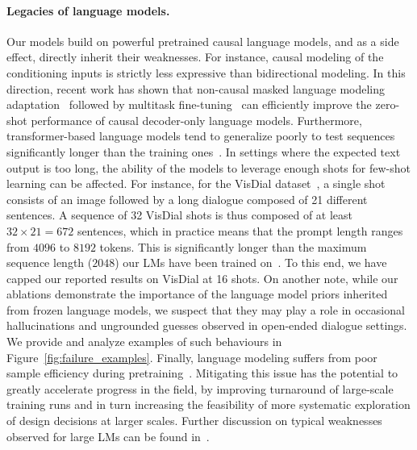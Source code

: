 \paragraph{Legacies of language models.} Our models build on powerful pretrained causal language models, and as a side effect, directly inherit their weaknesses.
For instance, causal modeling of the conditioning inputs is strictly less expressive than bidirectional modeling.
In this direction, recent work has shown that non-causal masked language modeling adaptation~\citep{wang2022noncausaladaptation} followed by multitask fine-tuning~\citep{t0,wei2021finetuned,xu2022zeroprompt} can efficiently improve the zero-shot performance of causal decoder-only language models.
Furthermore, transformer-based language models tend to generalize poorly to test sequences significantly longer than the training ones~\citep{press2021train}.
In settings where the expected text output is too long, the ability of the models to leverage enough shots for few-shot learning can be affected.
For instance, for the VisDial dataset~\citep{das2017visual}, a single shot consists of an image followed by a long dialogue composed of 21 different sentences.
A sequence of 32 VisDial shots is thus composed of at least $32 \times 21 = 672$ sentences, which in practice means that the prompt length ranges from $4096$ to $8192$ tokens.
This is significantly longer than the maximum sequence length ($2048$) our LMs have been trained on~\citep{chinchilla}.
To this end, we have capped our reported results on VisDial at 16 shots.
On another note, while our ablations demonstrate the importance of the language model priors inherited from frozen language models, we suspect that they may play a role in occasional hallucinations and ungrounded guesses observed in open-ended dialogue settings. We provide and analyze examples of such behaviours in Figure~\ref{fig:failure_examples}.
Finally, language modeling suffers from poor sample efficiency during pretraining~\citep{gpt3}. 
Mitigating this issue has the potential to greatly accelerate progress in the field,
by improving turnaround of large-scale training runs and in turn increasing the feasibility of more systematic exploration of design decisions at larger scales.
Further discussion on typical weaknesses observed for large LMs can be found in~\citep{gpt3,gopher}.


